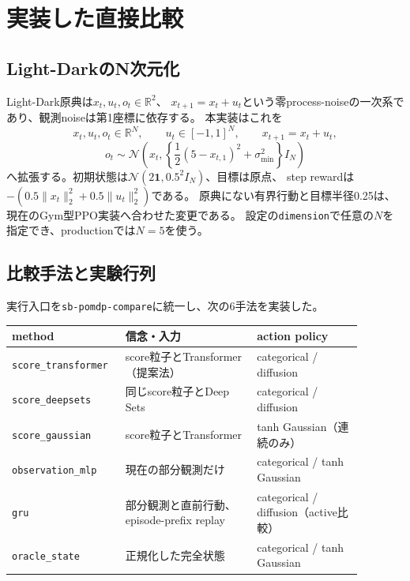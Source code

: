 \documentclass[a4paper,11pt]{article}
\begin{document}
\section{実装した直接比較}

\subsection{Light-DarkのN次元化}

Light-Dark原典\cite{platt2010belief}は$x_t,u_t,o_t\in\mathbb R^2$、
$x_{t+1}=x_t+u_t$という零process-noiseの一次系であり、観測noiseは第1座標に依存する。
本実装はこれを
\begin{equation}
  x_t,u_t,o_t\in\mathbb R^N,\qquad
  u_t\in[-1,1]^N,\qquad x_{t+1}=x_t+u_t,
\end{equation}
\begin{equation}
  o_t\sim\mathcal N\!\left(x_t,
  \left\{\frac{1}{2}(5-x_{t,1})^2+\sigma_{\min}^2\right\}I_N\right)
\end{equation}
へ拡張する。初期状態は$\mathcal N(2\mathbf 1,0.5^2I_N)$、目標は原点、
step rewardは$-(0.5\lVert x_t\rVert_2^2+0.5\lVert u_t\rVert_2^2)$である。
原典にない有界行動と目標半径0.25は、現在のGym型PPO実装へ合わせた変更である。
設定の\texttt{dimension}で任意の$N$を指定でき、productionでは$N=5$を使う。

\subsection{比較手法と実験行列}

実行入口を\verb|sb-pomdp-compare|に統一し、次の6手法を実装した。
\begin{center}
\small
\begin{tabular}{p{0.25\linewidth}p{0.35\linewidth}p{0.28\linewidth}}
\hline
method & 信念・入力 & action policy \\
\hline
\texttt{score\_transformer} & score粒子とTransformer（提案法） & categorical / diffusion \\
\texttt{score\_deepsets} & 同じscore粒子とDeep Sets & categorical / diffusion \\
\texttt{score\_gaussian} & score粒子とTransformer & tanh Gaussian（連続のみ） \\
\texttt{observation\_mlp} & 現在の部分観測だけ & categorical / tanh Gaussian \\
\texttt{gru} & 部分観測と直前行動、episode-prefix replay & categorical / diffusion（active比較） \\
\texttt{oracle\_state} & 正規化した完全状態 & categorical / tanh Gaussian \\
\hline
\end{tabular}
\end{center}
\end{document}
